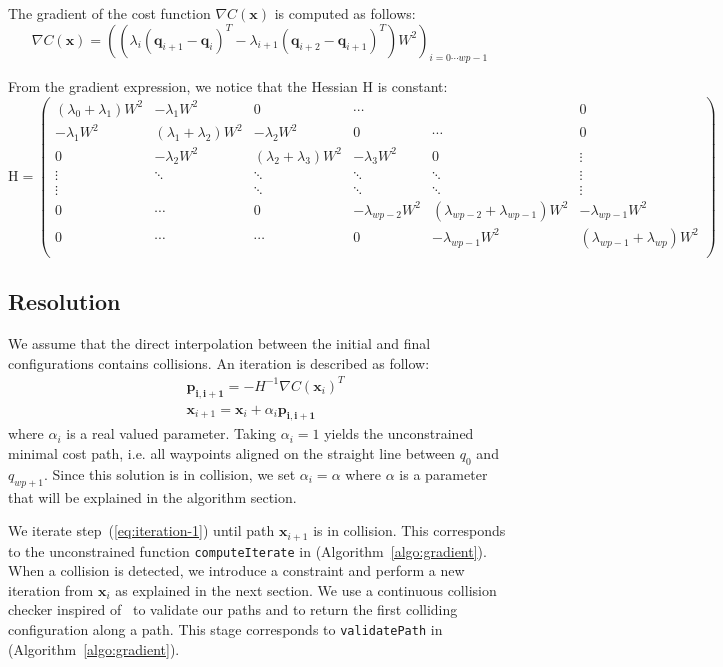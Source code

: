 \documentclass{tADR2e}
\newcommand\pii{\mathbf{p_{i,i+1}}}
\newcommand\conf{\mathbf{q}}
\newcommand\xx{\mathbf{x}} %
\newcommand\cost{C}
\newcommand\weight{W}
\begin{document}
The gradient of the cost function $\nabla \cost (\xx)$ is computed as follows:
$$
\nabla \cost (\xx) = 
\left( (\lambda_{i}(\conf_{i+1} - \conf_{i})^T - \lambda_{i+1}(\conf_{i+2} - \conf_{i+1})^T) \weight^2 \right)_{i=0\cdots wp-1}
$$


From the gradient expression, we notice that the Hessian $\mbox{H}$ is constant:
$$
\mbox{H} = \left(\begin{array}{cccccc}
(\lambda_{0}+\lambda_{1})\weight^2 & -\lambda_{1}\weight^2 & 0 & \cdots & & 0 \\
-\lambda_{1}\weight^2 & (\lambda_{1}+\lambda_{2})\weight^2 & -\lambda_{2}\weight^2 & 0 & \cdots & 0 \\
0 & -\lambda_{2}\weight^2 &  (\lambda_{2}+\lambda_{3})\weight^2 & -\lambda_{3}\weight^2 & 0 & \vdots \\
\vdots & \ddots & \ddots & \ddots & \ddots & \vdots\\
\vdots & & \ddots & \ddots & \ddots & \vdots\\
0 & \cdots  & 0 & -\lambda_{wp-2}\weight^2 & (\lambda_{wp-2}+\lambda_{wp-1})\weight^2 & -\lambda_{wp-1}\weight^2 \\
0 & \cdots &  \cdots & 0 & -\lambda_{wp-1}\weight^2 & (\lambda_{wp-1}+\lambda_{wp})\weight^2  \\
\end{array}\right)
$$

\subsection {Resolution}
We assume that the direct interpolation between the initial and final configurations contains collisions. An iteration is described as follow:
\begin{equation}\label{eq:iteration-1}
\begin{split}
& \pii =  -H^{-1} \nabla \cost(\xx_i)^{T} \\
& \xx_{i+1} =  \xx_{i} + \alpha_i \pii
\end{split} 
\end{equation}
where $\alpha_i$ is a real valued parameter. Taking $\alpha_i=1$ yields the 
unconstrained minimal cost path, i.e. all waypoints aligned on the straight line 
between $q_0$ and $q_{wp+1}$. Since this solution is in collision, we set 
$\alpha_i = \alpha$ 
where $\alpha$ is a parameter that will be explained in the algorithm section.

We iterate step~(\ref{eq:iteration-1}) until path $\xx_{i+1}$ is in collision. This 
corresponds to the unconstrained function \texttt{computeIterate} in 
(Algorithm~\ref{algo:gradient}).
When a collision is detected, we introduce a constraint and perform a new 
iteration from $\xx_i$ as explained in the next section. We use a continuous 
collision checker inspired of~\cite{SchwarzerExactCollision} to validate our 
paths and to return the first colliding configuration along a path. This stage corresponds to \texttt{validatePath} in (Algorithm~\ref{algo:gradient}).
\end{document}
